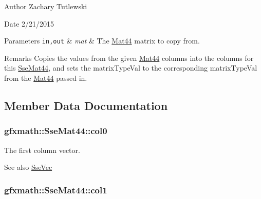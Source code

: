 \begin{DoxyAuthor}{Author}
Zachary Tutlewski 
\end{DoxyAuthor}
\begin{DoxyDate}{Date}
2/21/2015
\end{DoxyDate}

\begin{DoxyParams}[1]{Parameters}
\mbox{\tt in,out}  & {\em mat} & The \hyperlink{structgfxmath_1_1_mat44}{Mat44} matrix to copy from.\\
\hline
\end{DoxyParams}
\begin{DoxyRemark}{Remarks}
Copies the values from the given \hyperlink{structgfxmath_1_1_mat44}{Mat44} columns into the columns for this \hyperlink{structgfxmath_1_1_sse_mat44}{Sse\+Mat44}, and sets the matrix\+Type\+Val to the corresponding matrix\+Type\+Val from the \hyperlink{structgfxmath_1_1_mat44}{Mat44} passed in. 
\end{DoxyRemark}


\subsection{Member Data Documentation}
\hypertarget{structgfxmath_1_1_sse_mat44_a5ba91c42ffa3a8158266badf214b07a6}{}
\subsubsection[{col0}]{ gfxmath\+::\+Sse\+Mat44\+::col0}\label{structgfxmath_1_1_sse_mat44_a5ba91c42ffa3a8158266badf214b07a6}


The first column vector. 

\begin{DoxySeeAlso}{See also}
\hyperlink{namespacegfxmath_a0de2243e2b8d0fd46d3af5e036423004}{Sse\+Vec} 
\end{DoxySeeAlso}
\hypertarget{structgfxmath_1_1_sse_mat44_a836c79e6497a5aa122c240767e7376a1}{}
\subsubsection[{col1}]{ gfxmath\+::\+Sse\+Mat44\+::col1}\label{structgfxmath_1_1_sse_mat44_a836c79e6497a5aa122c240767e7376a1}


